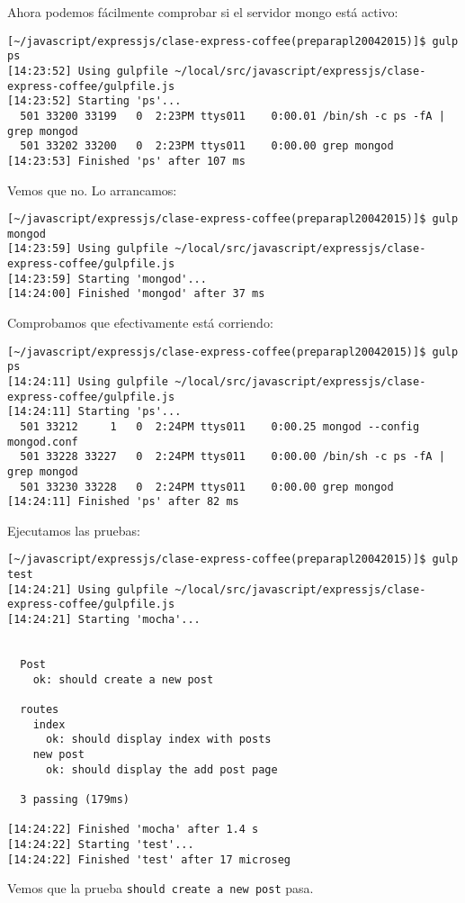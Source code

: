 Ahora podemos fácilmente comprobar si el servidor mongo está activo:
\begin{verbatim}
[~/javascript/expressjs/clase-express-coffee(preparapl20042015)]$ gulp ps
[14:23:52] Using gulpfile ~/local/src/javascript/expressjs/clase-express-coffee/gulpfile.js
[14:23:52] Starting 'ps'...
  501 33200 33199   0  2:23PM ttys011    0:00.01 /bin/sh -c ps -fA | grep mongod
  501 33202 33200   0  2:23PM ttys011    0:00.00 grep mongod
[14:23:53] Finished 'ps' after 107 ms
\end{verbatim}
Vemos que no. Lo arrancamos:
\begin{verbatim}
[~/javascript/expressjs/clase-express-coffee(preparapl20042015)]$ gulp mongod
[14:23:59] Using gulpfile ~/local/src/javascript/expressjs/clase-express-coffee/gulpfile.js
[14:23:59] Starting 'mongod'...
[14:24:00] Finished 'mongod' after 37 ms
\end{verbatim}
Comprobamos que efectivamente está corriendo:
\begin{verbatim}
[~/javascript/expressjs/clase-express-coffee(preparapl20042015)]$ gulp ps
[14:24:11] Using gulpfile ~/local/src/javascript/expressjs/clase-express-coffee/gulpfile.js
[14:24:11] Starting 'ps'...
  501 33212     1   0  2:24PM ttys011    0:00.25 mongod --config mongod.conf
  501 33228 33227   0  2:24PM ttys011    0:00.00 /bin/sh -c ps -fA | grep mongod
  501 33230 33228   0  2:24PM ttys011    0:00.00 grep mongod
[14:24:11] Finished 'ps' after 82 ms
\end{verbatim}
Ejecutamos las pruebas:
\begin{verbatim}
[~/javascript/expressjs/clase-express-coffee(preparapl20042015)]$ gulp test
[14:24:21] Using gulpfile ~/local/src/javascript/expressjs/clase-express-coffee/gulpfile.js
[14:24:21] Starting 'mocha'...


  Post
    ok: should create a new post

  routes
    index
      ok: should display index with posts
    new post
      ok: should display the add post page

  3 passing (179ms)

[14:24:22] Finished 'mocha' after 1.4 s
[14:24:22] Starting 'test'...
[14:24:22] Finished 'test' after 17 microseg
\end{verbatim}
Vemos que la prueba \verb|should create a new post| pasa.

